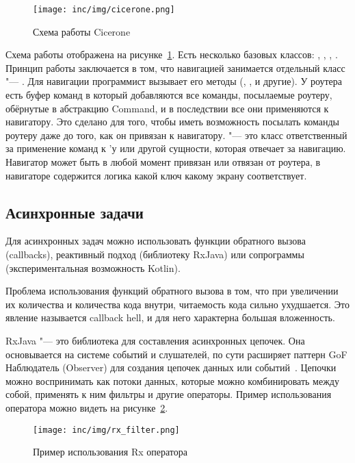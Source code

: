 \begin{figure}[ht]
  \texttt{[image: inc/img/cicerone.png]}
  \caption{Схема работы Cicerone}
  \label{fig:cicerone}
\end{figure}

Схема работы отображена на рисунке~\ref{fig:cicerone}.
Есть несколько базовых классов: , , , .
Принцип работы заключается в том, что навигацией занимается отдельный класс "--- .
Для навигации программист вызывает его методы (, ,  и другие).
У роутера есть буфер команд в который добавляются все команды, посылаемые роутеру, обёрнутые в абстракцию Command, и в последствии все они применяются к навигатору.
Это сделано для того, чтобы иметь возможность посылать команды роутеру даже до того, как он привязан к навигатору.
 "--- это класс ответственный за применение команд к 'у или другой сущности, которая отвечает за навигацию.
Навигатор может быть в любой момент привязан или отвязан от роутера, в навигаторе содержится логика какой ключ какому экрану соответствует.

\subsection{Асинхронные задачи}
\label{subsec:asyncTasks}
Для асинхронных задач можно использовать функции обратного вызова (callbacks), реактивный подход (библиотеку RxJava) или сопрограммы (экспериментальная возможность Kotlin).

Проблема использования функций обратного вызова в том, что при увеличении их количества и количества кода внутри, читаемость кода сильно ухудшается.
Это явление называется callback hell, и для него характерна большая вложенность.

RxJava "--- это библиотека для составления асинхронных цепочек.
Она основывается на системе событий и слушателей, по сути расширяет паттерн GoF Наблюдатель (Observer) для создания цепочек данных или событий~\cite{reactivex}.
Цепочки можно воспринимать как потоки данных, которые можно комбинировать между собой, применять к ним фильтры и другие операторы. Пример использования оператора можно видеть на рисунке~\ref{fig:rxFilter}.

\begin{figure}[ht]
  \centering
  \texttt{[image: inc/img/rx\_filter.png]}
  \caption{Пример использования Rx оператора }
  \label{fig:rxFilter}
\end{figure}

